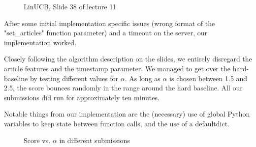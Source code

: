 \documentclass[a4paper, 11pt]{article}
\begin{document}
\begin{figure}[htbp]
\begin{center}
\setlength{\fboxsep}{0pt}%
\setlength{\fboxrule}{1pt}%
%

\caption{LinUCB, Slide 38 of lecture 11}
\label{default}
\end{center}
\end{figure}

After some initial implementation specific issues (wrong format of the "set\_articles" function parameter) and a timeout on the server, our implementation worked.

Closely following the algorithm description on the slides, we entirely disregard the article features and the timestamp parameter. We managed to get over the hard-baseline by testing different values for $\alpha$. As long as $\alpha$ is chosen between 1.5 and 2.5, the score bounces randomly in the range around the hard baseline. All our submissions did run for approximately ten minutes.

Notable things from our implementation are the (necessary) use of global Python variables to keep state between function calls, and the use of a defaultdict.

\begin{figure}[htbp]
\begin{center}
%

\caption{Score vs. $\alpha$ in different submissions}
\label{default}
\end{center}
\end{figure}
\end{document}
